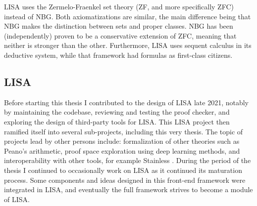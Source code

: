 LISA uses the Zermelo-Fraenkel set theory (ZF, and more specifically ZFC) instead of NBG. Both axiomatizations are similar, the main difference being that NBG makes the distinction between sets and proper classes. NBG has been (independently) proven to be a conservative extension of ZFC, meaning that neither is stronger than the other. Furthermore, LISA uses sequent calculus in its deductive system, while that framework had formulas as first-class citizens.

\subsection{LISA}

Before starting this thesis I contributed to the design of LISA late 2021, notably by maintaining the codebase, reviewing and testing the proof checker, and exploring the design of third-party tools for LISA. This LISA project then ramified itself into several sub-projects, including this very thesis. The topic of projects lead by other persons include: formalization of other theories such as Peano's arithmetic, proof space exploration using deep learning methods, and interoperability with other tools, for example Stainless \cite{Kuncak2021}. During the period of the thesis I continued to occasionally work on LISA as it continued its maturation process. Some components and ideas designed in this front-end framework were integrated in LISA, and eventually the full framework strives to become a module of LISA.

